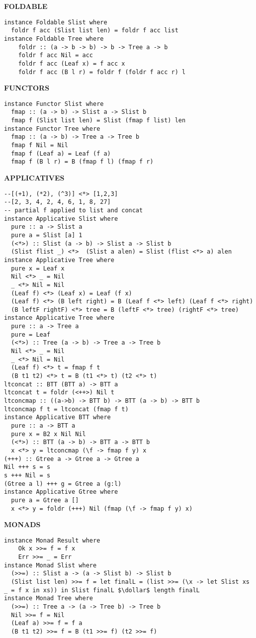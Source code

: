 \documentclass{article}
\newcommand{\dollar}{\mbox{\textdollar}}
\begin{document}
\begin{multicols*}{4}
\hrulefill

\textbf{FOLDABLE}
\begin{lstlisting}
instance Foldable Slist where
  foldr f acc (Slist list len) = foldr f acc list
instance Foldable Tree where
    foldr :: (a -> b -> b) -> b -> Tree a -> b
    foldr f acc Nil = acc
    foldr f acc (Leaf x) = f acc x
    foldr f acc (B l r) = foldr f (foldr f acc r) l
\end{lstlisting}

\hrulefill

\textbf{FUNCTORS}
\begin{lstlisting}
instance Functor Slist where
  fmap :: (a -> b) -> Slist a -> Slist b
  fmap f (Slist list len) = Slist (fmap f list) len
instance Functor Tree where
  fmap :: (a -> b) -> Tree a -> Tree b
  fmap f Nil = Nil
  fmap f (Leaf a) = Leaf (f a)
  fmap f (B l r) = B (fmap f l) (fmap f r)
\end{lstlisting}

\hrulefill

\textbf{APPLICATIVES}
\begin{lstlisting}
--[(+1), (*2), (^3)] <*> [1,2,3]
--[2, 3, 4, 2, 4, 6, 1, 8, 27]
-- partial f applied to list and concat
instance Applicative Slist where
  pure :: a -> Slist a
  pure a = Slist [a] 1
  (<*>) :: Slist (a -> b) -> Slist a -> Slist b
  (Slist flist _) <*>  (Slist a alen) = Slist (flist <*> a) alen
instance Applicative Tree where
  pure x = Leaf x
  Nil <*> _ = Nil
  _ <*> Nil = Nil
  (Leaf f) <*> (Leaf x) = Leaf (f x)
  (Leaf f) <*> (B left right) = B (Leaf f <*> left) (Leaf f <*> right)
  (B leftF rightF) <*> tree = B (leftF <*> tree) (rightF <*> tree)
instance Applicative Tree where
  pure :: a -> Tree a
  pure = Leaf
  (<*>) :: Tree (a -> b) -> Tree a -> Tree b
  Nil <*> _ = Nil
  _ <*> Nil = Nil
  (Leaf f) <*> t = fmap f t
  (B t1 t2) <*> t = B (t1 <*> t) (t2 <*> t)
ltconcat :: BTT (BTT a) -> BTT a
ltconcat t = foldr (<++>) Nil t
ltconcmap :: ((a->b) -> BTT b) -> BTT (a -> b) -> BTT b
ltconcmap f t = ltconcat (fmap f t)
instance Applicative BTT where
  pure :: a -> BTT a
  pure x = B2 x Nil Nil
  (<*>) :: BTT (a -> b) -> BTT a -> BTT b
  x <*> y = ltconcmap (\f -> fmap f y) x
(+++) :: Gtree a -> Gtree a -> Gtree a
Nil +++ s = s
s +++ Nil = s
(Gtree a l) +++ g = Gtree a (g:l)
instance Applicative Gtree where
  pure a = Gtree a []
  x <*> y = foldr (+++) Nil (fmap (\f -> fmap f y) x)
\end{lstlisting}

\hrulefill

\textbf{MONADS}
\begin{lstlisting}
instance Monad Result where
    Ok x >>= f = f x
    Err >>= _ = Err
instance Monad Slist where
  (>>=) :: Slist a -> (a -> Slist b) -> Slist b
  (Slist list len) >>= f = let finalL = (list >>= (\x -> let Slist xs _ = f x in xs)) in Slist finalL $\dollar$ length finalL
instance Monad Tree where
  (>>=) :: Tree a -> (a -> Tree b) -> Tree b
  Nil >>= f = Nil
  (Leaf a) >>= f = f a
  (B t1 t2) >>= f = B (t1 >>= f) (t2 >>= f)
\end{lstlisting}


\end{multicols*}
\end{document}
